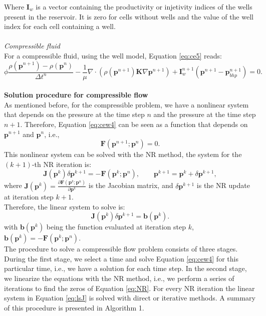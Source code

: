 \documentclass[12pt]{report}
\begin{document}
Where $\mathbf{I}_w$ is a vector containing the productivity or injetivity indices of the wells present in the reservoir. It is zero for cells without wells and the value of the well index for each cell containing a well.\\\\ 
\emph{Compressible fluid}\\
For a compressible fluid, using the well model, Equation \eqref{eq:ce5} reads:
\begin{equation}\label{eq:cew4}
 {\phi}\frac{{\rho}(\mathbf{p}^{n+1})
 -{\rho}(\mathbf{p}^{n})}{\Delta t^n}
 -\frac{1}{\mu}\nabla \cdot ({\rho}(\mathbf{p}^{n+1}) 
 \mathbf{K}\nabla\mathbf{p}^{n+1})+\mathbf{I}_w^{n+1}(\mathbf{p}^{n+1}-\mathbf{p}_{bhp}^{n+1})=0.
\end{equation}\\
\textbf{Solution procedure for compressible flow}\\
As mentioned before, for the compressible problem, we have a nonlinear system that depends on the pressure at the time step $n$ and the pressure at the time step $n+1$. Therefore, Equation \eqref{eq:cew4} can be seen as a function that depends on $\mathbf{p}^{n+1}$ and $\mathbf{p}^{n}$, i.e.,
\begin{equation}\label{eq:NR}
 \mathbf{F}(\mathbf{p}^{n+1};\mathbf{p}^n)=0.
\end{equation}
This nonlinear system can be solved with the NR method, the system for the $(k+1)$-th NR iteration is:
$$\mathbf{J}(\mathbf{p}^k)\delta\mathbf{p}^{k+1}=-\mathbf{F}(\mathbf{p}^k;\mathbf{p}^n),
\qquad \mathbf{p}^{k+1}=\mathbf{p}^k+\delta \mathbf{p}^{k+1},$$
where $\mathbf{J}(\mathbf{p}^k)=\frac{\partial \mathbf{F}(\mathbf{p}^k;\mathbf{p}^n)}{\partial \mathbf{p}^k}$ is the 
Jacobian matrix, and $\delta \mathbf{p}^{k+1}$ is the NR update at iteration step $k+1$.\\
Therefore, the linear system to solve is:\\
\begin{equation}\label{eq:lsJ}
\mathbf{J}(\mathbf{p}^k)\delta \mathbf{p}^{k+1}=\mathbf{b}(\mathbf{p}^k).
\end{equation}
with $\mathbf{b}(\mathbf{p}^k)$ being the function evaluated at iteration step $k$, $\mathbf{b}(\mathbf{p}^k)=-\mathbf{F}(\mathbf{p}^k;\mathbf{p}^n)$.\\
The procedure to solve a compressible flow problem consists of three stages. During the first stage, we select a 
time and solve Equation \eqref{eq:cew4} for this particular time, i.e., we have a solution for each time step. In the second stage, 
we linearize the equations with the NR method, i.e., we perform a series of iterations to find the 
zeros of Equation \eqref{eq:NR}. For every NR iteration the linear system in Equation \eqref{eq:lsJ} is solved with direct or iterative methods. A summary of 
this procedure is presented in Algorithm 1.
\end{document}

